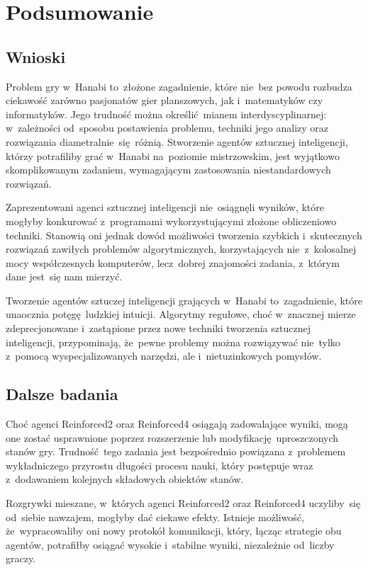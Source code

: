 \documentclass[declaration,shortabstract,inz]{iithesis}
\begin{document}
\chapter{Podsumowanie}

\section{Wnioski}

Problem gry w~Hanabi to~złożone zagadnienie, które nie~bez powodu rozbudza ciekawość zarówno pasjonatów gier planszowych, jak i~matematyków czy informatyków. Jego trudność można określić mianem interdyscyplinarnej: w~zależności od~sposobu postawienia problemu, techniki jego analizy oraz rozwiązania diametralnie~się różnią. Stworzenie agentów sztucznej inteligencji, którzy potrafiliby grać w~Hanabi na~poziomie mistrzowskim, jest wyjątkowo skomplikowanym zadaniem, wymagającym zastosowania niestandardowych rozwiązań.

Zaprezentowani agenci sztucznej inteligencji nie~osiągnęli wyników, które mogłyby konkurować z~programami wykorzystującymi złożone obliczeniowo techniki. Stanowią oni jednak dowód możliwości tworzenia szybkich i~skutecznych rozwiązań zawiłych problemów algorytmicznych, korzystających nie~z~kolosalnej mocy współczesnych komputerów, lecz~dobrej znajomości zadania, z~którym dane jest~się nam mierzyć.

Tworzenie agentów sztuczej inteligencji grających w~Hanabi to~zagadnienie, które unaocznia potęgę ludzkiej intuicji. Algorytmy regułowe, choć w~znacznej mierze zdeprecjonowane i~zastąpione przez nowe techniki tworzenia sztucznej inteligencji, przypominają, że~pewne problemy można rozwiązywać nie~tylko z~pomocą wyspecjalizowanych narzędzi, ale i~nietuzinkowych pomysłów.

\section{Dalsze badania}

Choć agenci Reinforced2 oraz Reinforced4 osiągają zadowalające wyniki, mogą one zostać usprawnione poprzez rozszerzenie lub modyfikację uproszczonych stanów gry. Trudność tego zadania jest bezpośrednio powiązana z~problemem wykładniczego przyrostu długości procesu nauki, który postępuje wraz z~dodawaniem kolejnych składowych obiektów stanów.

Rozgrywki mieszane, w~których agenci Reinforced2 oraz Reinforced4 uczyliby~się od~siebie nawzajem, mogłyby dać ciekawe efekty. Istnieje możliwość, że~wypracowaliby oni nowy protokół komunikacji, który, łącząc strategie obu agentów, potrafiłby osiągać wysokie i~stabilne wyniki, niezależnie od~liczby graczy.
\end{document}
